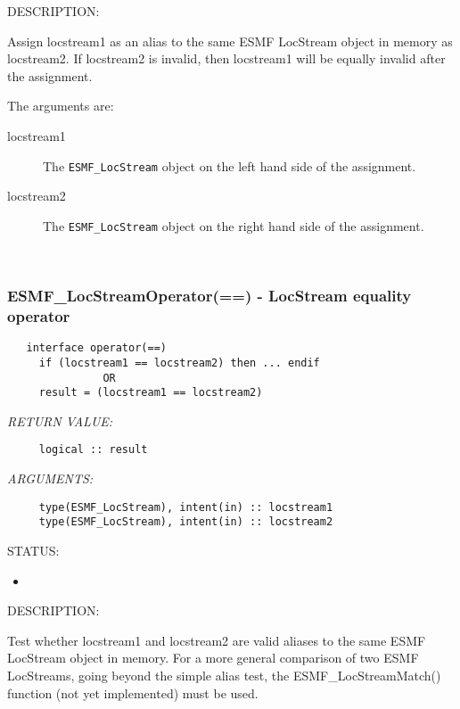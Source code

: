 {\sf DESCRIPTION:\\ }


     Assign locstream1 as an alias to the same ESMF LocStream object in memory
     as locstream2. If locstream2 is invalid, then locstream1 will be equally invalid after
     the assignment.
  
     The arguments are:
     \begin{description}
     \item[locstream1]
       The {\tt ESMF\_LocStream} object on the left hand side of the assignment.
     \item[locstream2]
       The {\tt ESMF\_LocStream} object on the right hand side of the assignment.
     \end{description}
   
 
\mbox{}\hrulefill\ 
 
\subsubsection [ESMF\_LocStreamOperator(==)] {ESMF\_LocStreamOperator(==) - LocStream equality operator}


  
\begin{verbatim}   interface operator(==)
     if (locstream1 == locstream2) then ... endif
               OR
     result = (locstream1 == locstream2)\end{verbatim}{\em RETURN VALUE:}
\begin{verbatim}     logical :: result\end{verbatim}{\em ARGUMENTS:}
\begin{verbatim}     type(ESMF_LocStream), intent(in) :: locstream1
     type(ESMF_LocStream), intent(in) :: locstream2\end{verbatim}
{\sf STATUS:}
   \begin{itemize}
   \item{}
   \end{itemize}
  
{\sf DESCRIPTION:\\ }


     Test whether locstream1 and locstream2 are valid aliases to the same ESMF
     LocStream object in memory. For a more general comparison of two ESMF LocStreams,
     going beyond the simple alias test, the ESMF\_LocStreamMatch() function (not yet
     implemented) must be used.
  

